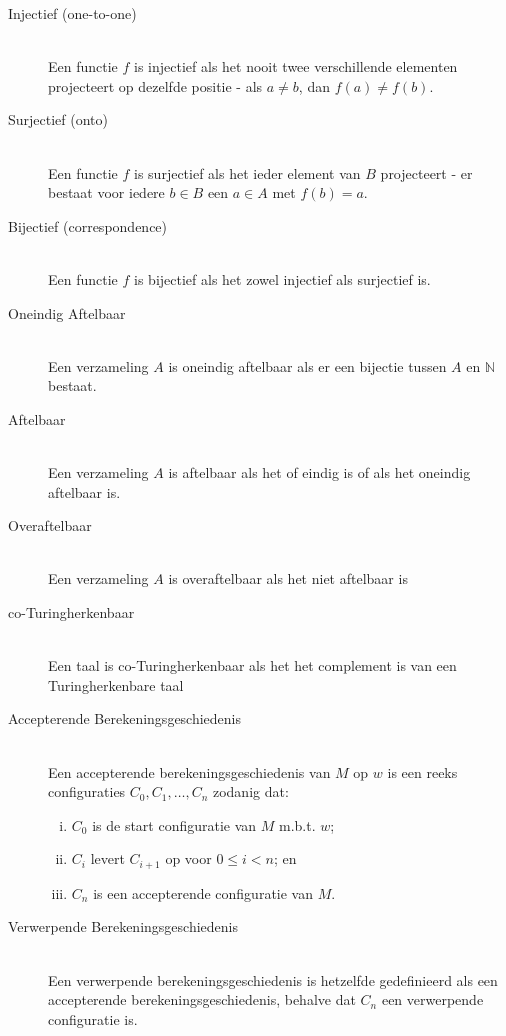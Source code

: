 \documentclass[]{article}
\begin{document}
\begin{itemize}
\begin{description}
	
	\item[Injectief (one-to-one)] \hfill \\
	Een functie $f$ is injectief als het nooit twee verschillende elementen projecteert op dezelfde positie - als $a \neq b$, dan $f(a) \neq f(b)$.
	
	\item[Surjectief (onto)] \hfill \\
	Een functie $f$ is surjectief als het ieder element van $B$ projecteert - er bestaat voor iedere $b \in B$ een $a \in A$ met $f(b) = a$.
	
	\item[Bijectief (correspondence)] \hfill \\
	Een functie $f$ is bijectief als het zowel injectief als surjectief is.
	
	\item[Oneindig Aftelbaar] \hfill \\
	Een verzameling $A$ is oneindig aftelbaar als er een bijectie tussen $A$ en $\mathbb{N}$ bestaat.
	
	\item[Aftelbaar] \hfill \\
	Een verzameling $A$ is aftelbaar als het of eindig is of als het oneindig aftelbaar is.
	
	\item[Overaftelbaar] \hfill \\
	Een verzameling $A$ is overaftelbaar als het niet aftelbaar is
	
	\item[co-Turingherkenbaar] \hfill \\
	Een taal is co-Turingherkenbaar als het het complement is van een Turingherkenbare taal
	
	\item[Accepterende Berekeningsgeschiedenis] \hfill \\
	Een accepterende berekeningsgeschiedenis van $M$ op $w$ is een reeks configuraties $C_0,C_1,\dots,C_n$ zodanig dat:
	\begin{enumerate}[i.]
		\item $C_0$ is de start configuratie van $M$ m.b.t. $w$;
		\item $C_i$ levert $C_{i+1}$ op voor $0 \leq i < n$; en
		\item $C_n$ is een accepterende configuratie van $M$.
	\end{enumerate}
	
	\item[Verwerpende Berekeningsgeschiedenis] \hfill \\
	Een verwerpende berekeningsgeschiedenis is hetzelfde gedefinieerd als een accepterende berekeningsgeschiedenis, behalve dat $C_n$ een verwerpende configuratie is.
	

\end{description}
\end{itemize}
\end{document}
